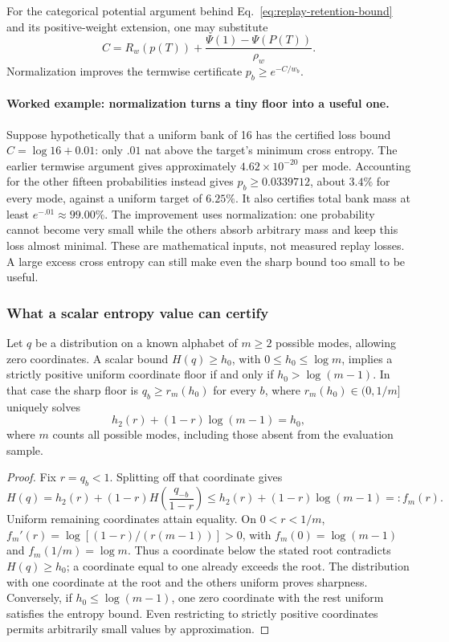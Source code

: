 For the categorical potential argument behind
Eq.~\eqref{eq:replay-retention-bound} and its positive-weight extension,
one may substitute
\[
 C=R_w(p(T))+
 \frac{\Psi(1)-\Psi(P(T))}{\rho_w}.
\]
Normalization improves the termwise certificate $p_b\ge e^{-C/w_b}$.

\paragraph{Worked example: normalization turns a tiny floor into a useful one.}
Suppose hypothetically that a uniform bank of 16 has the certified loss bound
$C=\log16+0.01$: only $.01$ nat above the target's minimum cross entropy.
The earlier termwise argument gives approximately $4.62\times10^{-20}$ per
mode. Accounting for the other fifteen probabilities instead gives
$p_b\ge0.0339712$, about $3.4\%$ for every mode, against a uniform target of
$6.25\%$. It also certifies total bank mass at least $e^{-.01}\approx99.00\%$.
The improvement uses normalization: one probability cannot become very small
while the others absorb arbitrary mass and keep this loss almost minimal.
These are mathematical inputs, not measured replay losses. A large excess
cross entropy can still make even the sharp bound too small to be useful.

\subsubsection{What a scalar entropy value can certify}

\begin{theorem}
\label{ext:entropy-retention-threshold}
Let $q$ be a distribution on a known alphabet of $m\ge2$ possible modes,
allowing zero coordinates. A scalar bound $H(q)\ge h_0$, with
$0\le h_0\le\log m$, implies a strictly positive uniform coordinate floor
if and only if $h_0>\log(m-1)$. In that case the sharp floor is
$q_b\ge r_m(h_0)$ for every $b$, where $r_m(h_0)\in(0,1/m]$ uniquely solves
\[
 h_2(r)+(1-r)\log(m-1)=h_0,
\]
where $m$ counts all possible modes, including those absent from the
evaluation sample.
\end{theorem}
\begin{proof}
Fix $r=q_b<1$. Splitting off that coordinate gives
\[
 H(q)=h_2(r)+(1-r)H\!\left(\frac{q_{-b}}{1-r}\right)
 \le h_2(r)+(1-r)\log(m-1)=:f_m(r).
\]
Uniform remaining coordinates attain equality. On $0<r<1/m$,
$f_m'(r)=\log[(1-r)/(r(m-1))]>0$, with
$f_m(0)=\log(m-1)$ and $f_m(1/m)=\log m$. Thus a coordinate below the
stated root contradicts $H(q)\ge h_0$; a coordinate equal to one already
exceeds the root. The distribution with one coordinate at the root and the
others uniform proves sharpness. Conversely, if $h_0\le\log(m-1)$, one
zero coordinate with the rest uniform satisfies the entropy bound. Even
restricting to strictly positive coordinates permits arbitrarily small
values by approximation.
\end{proof}

